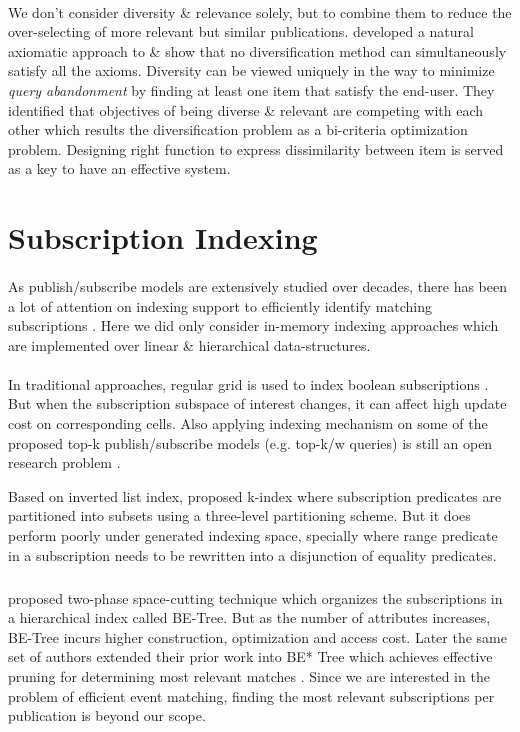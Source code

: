 \documentclass[a4paper,12pt,oneside]{book}
\theoremstyle{definition}
\theoremstyle{remark}
\begin{document}
\paragraph*{}
We don't consider diversity \& relevance solely, but to combine them to reduce the over-selecting of more relevant but similar publications. \cite{Gollapudi2009} developed a natural axiomatic approach to  \& show that no diversification method can simultaneously satisfy all the axioms. Diversity can be viewed uniquely in the way to minimize \emph{query abandonment} by finding at least one item that satisfy the end-user. They identified that objectives of being diverse \& relevant are competing with each other which results the diversification problem as a bi-criteria optimization problem. Designing right function to express dissimilarity between item is served as a key to have an effective system. 

\section{Subscription Indexing}
\paragraph*{}
As publish/subscribe models are extensively studied over decades, there has been a lot of attention on indexing support to efficiently identify matching subscriptions \cite{Machanavajjhala2008,Whang2009,Sadoghi2011, Matching2012, Zhang2014}. Here we did only consider in-memory indexing approaches which are implemented over linear \& hierarchical data-structures.  

\paragraph*{}
In traditional approaches, regular grid is used to index boolean subscriptions \cite{Mouratidis2006}. But when the subscription subspace of interest changes, it can affect high update cost on corresponding cells. Also applying indexing mechanism on some of the proposed top-k publish/subscribe models (e.g. top-k/w queries) is still an open research problem \cite{Pripuzic2012}.

Based on inverted list index, \cite{Whang2009} proposed k-index where subscription predicates are partitioned into subsets using a three-level partitioning scheme. But it does perform poorly under generated indexing space, specially where range predicate in a subscription needs to be rewritten into a disjunction of equality predicates. 
\subparagraph*{}
\cite{Sadoghi2011} proposed two-phase space-cutting technique which organizes the subscriptions in a hierarchical index called BE-Tree. But as the number of attributes increases, BE-Tree incurs higher construction, optimization and access cost. Later the same set of authors extended their prior work into BE* Tree which achieves effective pruning for determining most relevant matches \cite{Matching2012}. Since we are interested in the problem of efficient event matching, finding the most relevant subscriptions per publication is beyond our scope.
\end{document}
